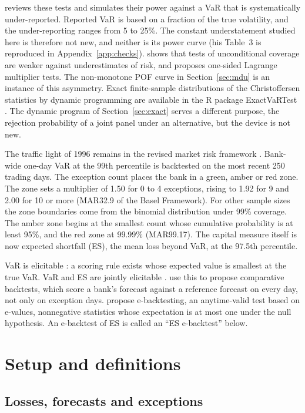 \documentclass[11pt]{article}
\begin{document}
\citet{campbell2005} reviews these tests and simulates their power against a
VaR that is systematically under-reported. Reported VaR is based on a fraction
of the true volatility, and the under-reporting ranges from 5 to 25\%. The constant understatement studied here is therefore not new, and neither is
its power curve (his Table~3 is reproduced in Appendix~\ref{app:checks}).
\citet{thiele2019} shows that tests of unconditional coverage are weaker
against underestimates of risk, and proposes one-sided Lagrange multiplier
tests. The non-monotone POF curve in Section~\ref{sec:mdu} is an instance of
this asymmetry. Exact finite-sample distributions of the Christoffersen
statistics by dynamic programming are available in the R package ExactVaRTest
\citep{exactvartest}. The dynamic program of Section~\ref{sec:exact} serves a
different purpose, the rejection probability of a joint panel under an
alternative, but the device is not new.

The traffic light of 1996 remains in the revised market risk framework
\citep{bcbsmar}. Bank-wide one-day VaR at the 99th percentile is
backtested on the most recent 250 trading days. The exception count places the
bank in a green, amber or red zone. The zone sets a multiplier of 1.50 for 0 to
4 exceptions, rising to 1.92 for 9 and 2.00 for 10 or more (MAR32.9 of the
Basel Framework). For other sample sizes the
zone boundaries come from the binomial distribution under 99\% coverage. The
amber zone begins at the smallest count whose cumulative probability is at
least 95\%, and the red zone at 99.99\% (MAR99.17). The capital measure itself is now expected shortfall (ES), the mean loss
beyond VaR, at the 97.5th percentile.

VaR is elicitable \citep{gneiting2011}: a scoring rule exists whose expected
value is smallest at the true VaR. VaR and ES are jointly elicitable
\citep{fissler2016}. \citet{nolde2017} use this to propose comparative
backtests, which score a bank's forecast against a reference forecast on every
day, not only on exception days. 
\citet{wang2025} propose e-backtesting, an anytime-valid test based on
e-values, nonnegative statistics whose expectation is at most one under the
null hypothesis. An e-backtest of ES is called an ``ES e-backtest'' below.

\section{Setup and definitions}
\label{sec:setup}

\subsection{Losses, forecasts and exceptions}
\end{document}
